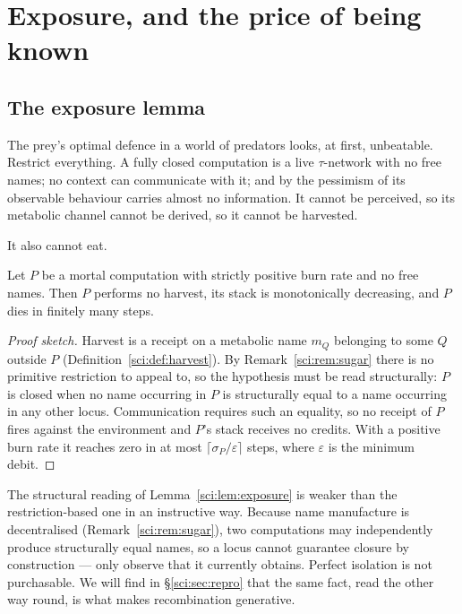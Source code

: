 \section{Exposure, and the price of being known}\label{sci:S9}
\label{sci:sec:exposure}

\subsection{The exposure lemma}\label{sci:S9.1}

The prey's optimal defence in a world of predators looks, at first, unbeatable. Restrict everything.
A fully closed computation is a live $\tau$-network with no free names; no context can communicate
with it; and by the pessimism of \cite[\S1]{ClassifierNote} its observable behaviour carries almost no
information. It cannot be perceived, so its metabolic channel cannot be derived, so it cannot be
harvested.

It also cannot eat.

\begin{lemma}[Exposure]
\label{sci:lem:exposure}
Let $P$ be a mortal computation with strictly positive burn rate and no free names. Then $P$ performs
no harvest, its stack is monotonically decreasing, and $P$ dies in finitely many steps.
\end{lemma}

\begin{proof}[Proof sketch]
Harvest is a receipt on a metabolic name $m_Q$ belonging to some $Q$ outside $P$
(Definition~\ref{sci:def:harvest}). By Remark~\ref{sci:rem:sugar} there is no primitive restriction to appeal
to, so the hypothesis must be read structurally: $P$ is closed when no name occurring in $P$ is
structurally equal to a name occurring in any other locus. Communication requires such an equality, so
no receipt of $P$ fires against the environment and $P$'s stack receives no credits. With a positive
burn rate it reaches zero in at most $\lceil \sigma_P / \varepsilon \rceil$ steps, where $\varepsilon$
is the minimum debit.
\end{proof}

\begin{remark}
\label{sci:rem:luck}
The structural reading of Lemma~\ref{sci:lem:exposure} is weaker than the restriction-based one in an
instructive way. Because name manufacture is decentralised (Remark~\ref{sci:rem:sugar}), two computations
may independently produce structurally equal names, so a locus cannot guarantee closure by
construction --- only observe that it currently obtains. Perfect isolation is not purchasable. We will
find in \S\ref{sci:sec:repro} that the same fact, read the other way round, is what makes recombination
generative.
\end{remark}

